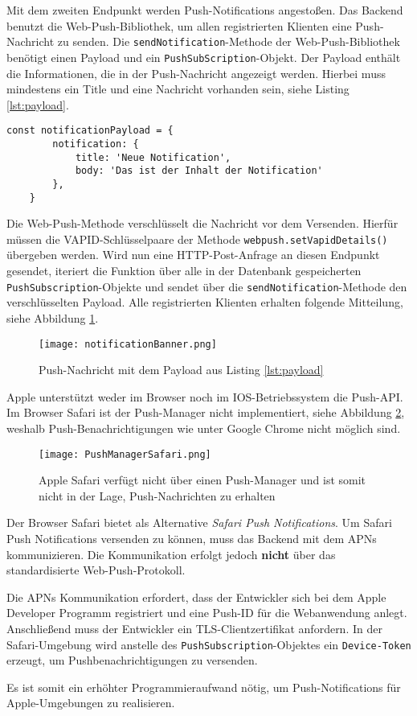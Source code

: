 Mit dem zweiten Endpunkt werden Push-Notifications angestoßen. Das Backend benutzt die Web-Push-Bibliothek, um allen registrierten Klienten eine Push-Nachricht zu senden.  Die \texttt{sendNotification}-Methode der Web-Push-Bibliothek benötigt einen Payload und ein \texttt{PushSubScription}-Objekt. Der Payload enthält die Informationen, die in der Push-Nachricht angezeigt werden. Hierbei muss mindestens ein Title und eine Nachricht vorhanden sein, siehe Listing \ref{lst:payload}. 

\begin{lstlisting}[caption={Mindestanforderung an einen Payload für eine Push-Nachricht}, label=lst:payload, float=!htb]
    const notificationPayload = {
        notification: {
            title: 'Neue Notification',
            body: 'Das ist der Inhalt der Notification'
        },
    }
\end{lstlisting}

Die Web-Push-Methode verschlüsselt die Nachricht vor dem Versenden. Hierfür müssen die VAPID-Schlüsselpaare der Methode \texttt{webpush.setVapidDetails()} übergeben werden. 
Wird nun eine HTTP-Post-Anfrage an diesen Endpunkt gesendet, iteriert die Funktion über alle in der Datenbank gespeicherten \texttt{PushSubscription}-Objekte und sendet über die \texttt{sendNotification}-Methode den verschlüsselten Payload. Alle registrierten Klienten erhalten folgende Mitteilung, siehe Abbildung \ref{img:notificationBanner}.

\begin{figure}[!htb]
    \centering
    \texttt{[image: notificationBanner.png]}
    \caption{Push-Nachricht mit dem Payload aus Listing \ref{lst:payload}}
    \label{img:notificationBanner}
\end{figure}


Apple unterstützt weder im Browser noch im IOS-Betriebssystem die Push-API. Im Browser Safari ist der Push-Manager nicht implementiert, siehe Abbildung \ref{img:PushManagerBrowser}, weshalb  Push-Benachrichtigungen wie unter Google Chrome nicht möglich sind. 

\begin{figure}[!htb]
    \centering
    \texttt{[image: PushManagerSafari.png]}
    \caption{Apple Safari verfügt nicht über einen Push-Manager und ist somit nicht in der Lage, Push-Nachrichten zu erhalten}
    \label{img:PushManagerBrowser}
\end{figure}


Der Browser Safari bietet als Alternative \textit{Safari Push Notifications}. Um Safari Push Notifications versenden zu können, muss das Backend mit dem \ac*{APNs} kommunizieren. Die Kommunikation erfolgt jedoch \textbf{nicht} über das standardisierte Web-Push-Protokoll.

Die APNs Kommunikation erfordert, dass der Entwickler sich bei dem Apple Developer Programm registriert und eine Push-ID für die Webanwendung anlegt. Anschließend muss der Entwickler ein \ac*{TLS}-Clientzertifikat anfordern. In der Safari-Umgebung wird anstelle des \texttt{PushSubscription}-Objektes ein \texttt{Device-Token} erzeugt, um Pushbenachrichtigungen zu versenden. 

Es ist somit ein erhöhter Programmieraufwand nötig, um Push-Notifications für Apple-Umgebungen zu realisieren.
